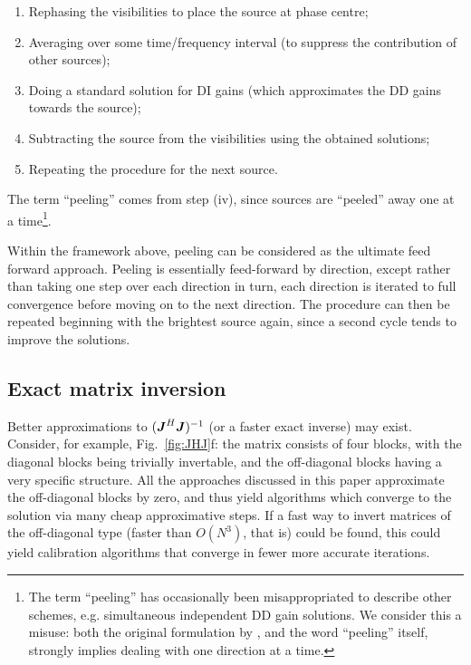 \documentclass[useAMS,usenatbib]{mn2e}
\newcommand{\mat}[1]{{\bmath{#1}}}
\newcommand{\JJ}{\mat{J}} %
\newcommand{\JHJ}{\JJ^H\JJ} %
\begin{document}
\begin{enumerate}
\item Rephasing the visibilities to place the source at phase centre;
\item Averaging over some time/frequency interval (to suppress the contribution of other sources);
\item Doing a standard solution for DI gains (which approximates the DD gains towards the source);
\item Subtracting the source from the visibilities using the obtained solutions;
\item Repeating the procedure for the next source.
\end{enumerate}

The term ``peeling'' comes from step (iv), since sources are ``peeled'' away one at a time\footnote{The term ``peeling'' has 
occasionally been misappropriated to describe other schemes, e.g. simultaneous independent DD gain solutions. We consider this a 
misuse: both the original formulation by \citet{JEN:peeling}, and the word ``peeling'' itself, strongly implies dealing with 
one direction at a time.}.

Within the framework above, peeling can be considered as the ultimate feed forward approach. Peeling is essentially feed-forward by direction, except rather than taking one step over each direction in turn, each direction is iterated to full convergence before moving on to the next direction. The procedure can then be repeated beginning with the brightest source again, since a second cycle tends to improve the solutions. 

\subsection{Exact matrix inversion}

Better approximations to $(\JHJ)^{-1}$ (or a faster exact inverse) may exist. Consider, for example, Fig.~\ref{fig:JHJ}f: 
the matrix consists of four blocks, with the diagonal blocks being trivially invertable, and the off-diagonal blocks having a 
very specific structure. All the approaches discussed in this paper approximate the off-diagonal blocks by zero, and thus 
yield algorithms which converge to the solution via many cheap approximative steps. If a fast way to invert matrices of the 
off-diagonal type (faster than $O(N^3)$, that is) could be found, this could yield calibration algorithms that converge in fewer 
more accurate iterations.
\end{document}
